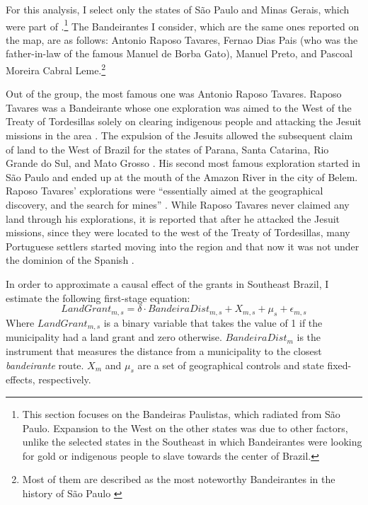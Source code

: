 \documentclass[11pt]{article}
\begin{document}


For this analysis, I select only the states of São Paulo and Minas Gerais, which were part of .\footnote{This section focuses on the Bandeiras Paulistas, which radiated from São Paulo. Expansion to the West on the other states was due to other factors, unlike the selected states in the Southeast in which Bandeirantes were looking for gold or indigenous people to slave towards the center of Brazil.} 
The Bandeirantes I consider, which are the same ones reported on the map, are as follows: Antonio Raposo Tavares, Fernao Dias Pais (who was the father-in-law of the famous Manuel de Borba Gato), Manuel Preto, and Pascoal Moreira Cabral Leme.\footnote{Most of them are described as the most noteworthy Bandeirantes in the history of São Paulo \parencite[p.~43]{Prestes_Filho2012-dp}}

Out of the group, the most famous one was Antonio Raposo Tavares.
Raposo Tavares was a Bandeirante whose one exploration was aimed to the West of the Treaty of Tordesillas solely on clearing indigenous people and attacking the Jesuit missions in the area \parencite[p.~406]{Franco1954-bk}.
The expulsion of the Jesuits allowed the subsequent claim of land to the West of Brazil for the states of Parana, Santa Catarina, Rio Grande do Sul, and Mato Grosso \parencite[p.~405]{Franco1954-bk}.
His second most famous exploration started in São Paulo and ended up at the mouth of the Amazon River in the city of Belem.
Raposo Tavares' explorations were ``essentially aimed at the geographical discovery, and the search for mines'' \parencite[p.~395]{Cortesao1958-hm}.
While Raposo Tavares never claimed any land through his explorations, it is reported that after he attacked the Jesuit missions, since they were located to the west of the Treaty of Tordesillas, many Portuguese settlers started moving into the region and that now it was not under the dominion of the Spanish \parencite[p.~406]{Franco1954-bk}.

In order to approximate a causal effect of the grants in Southeast Brazil, I estimate the following first-stage equation:
\begin{equation}
  \label{eqn:firststage}
  LandGrant_{m,s} = \delta \cdot BandeiraDist_{m,s} +  X_{m,s} + \mu_s  + \epsilon_{m,s}
\end{equation}
Where $LandGrant_{m,s}$ is a binary variable that takes the value of 1 if the municipality had a land grant and zero otherwise. 
$BandeiraDist_m$ is the instrument that measures the distance from a municipality to the closest \textit{bandeirante} route. 
$X_m$ and $\mu_s$ are a set of geographical controls and state fixed-effects, respectively.
\end{document}
